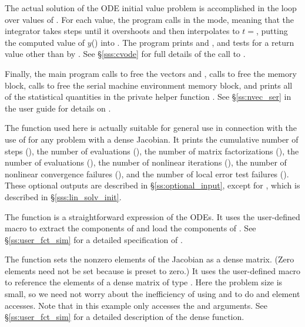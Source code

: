 The actual solution of the ODE initial value problem is accomplished
in the loop over values of .  For each value, the program
calls  in the  mode, meaning that the integrator
takes steps until it overshoots  and then interpolates to 
$t = $, putting the computed value of $y$() into
.  The program prints  and , and tests for a 
return value other than  by .  See 
\S\ref{sss:cvode} for full details of the call to .

Finally, the main program calls  to free the vectors
 and , calls  to free the {\cvode}
memory block, calls  to free the serial machine
environment memory block, and prints all of the statistical quantities in the
private helper function .
See \S\ref{ss:nvec_ser} in the user guide for details on .

The function  used here is actually suitable for
general use in connection with the use of {\cvode} for any problem with 
a dense Jacobian.  It prints the cumulative number of steps
(), the number of  evaluations (), 
the number of matrix factorizations (), 
the number of  evaluations (), 
the number of nonlinear iterations (), 
the number of nonlinear convergence failures (), and 
the number of local error test failures ().
These optional outputs are described in \S\ref{ss:optional_input},
except for , which is described in 
\S\ref{sss:lin_solv_init}.

The function  is a straightforward expression of the ODEs. 
It uses the user-defined macro 
to extract the components of  and load the components of .
See \S\ref{ss:user_fct_sim} for a detailed specification of .

The function  sets the nonzero elements of the Jacobian
as a dense matrix.  (Zero elements need not be set because 
is preset to zero.)  It uses the user-defined macro
to reference the elements of a dense matrix of type .
Here the problem size is small, so we need not worry about the
inefficiency of using  and  to do
 and  element accesses.
Note that in this example  only accesses the  and  arguments.
See \S\ref{ss:user_fct_sim} for a detailed description of the dense  function.


